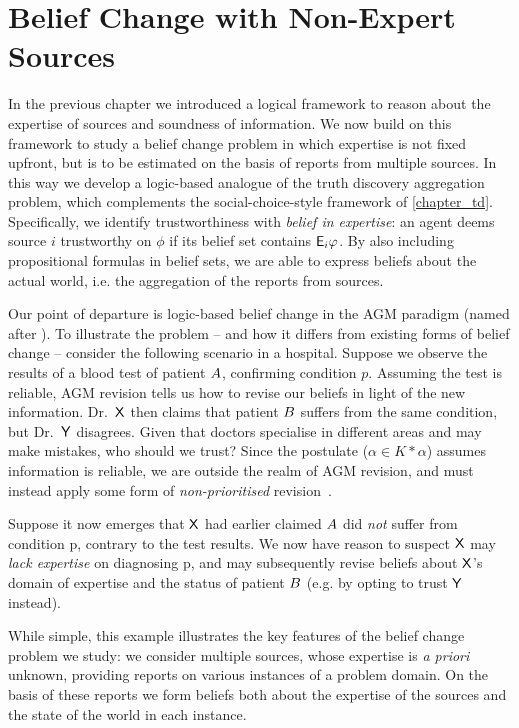 \chapter{Belief Change with Non-Expert Sources}
\label{chapter_belief_change}

In the previous chapter we introduced a logical framework to reason about the
expertise of sources and soundness of information. We now build on this
framework to study a belief change problem in which expertise is not fixed
upfront, but is to be estimated on the basis of reports from multiple sources.
In this way we develop a logic-based analogue of the truth discovery
aggregation problem, which complements the social-choice-style framework of
\cref{chapter_td}. Specifically, we identify trustworthiness with \emph{belief
in expertise}: an agent deems source $i$ trustworthy on $\phi$ if its belief
set contains $\mathsf{E}_i\varphi$. By also including
propositional formulas in belief sets, we are able to express beliefs about the
actual world, i.e. the aggregation of the reports from sources.

Our point of departure is logic-based belief change in the AGM
paradigm (named after \textcite{alchourron1985logic}).
%
%
To illustrate the problem -- and how it
differs from existing forms of belief change -- consider the following scenario
in a hospital. Suppose we observe the results of a blood test of patient $A$,
confirming condition $p$. Assuming the test is reliable, AGM revision tells us
how to revise our beliefs in light of the new information. Dr.\ $\mathsf{X}$ then claims
that patient $B$ suffers from the same condition, but Dr.\ $\mathsf{Y}$ disagrees. Given
that doctors specialise in different areas and may make mistakes, who should we
trust?
%
Since the  postulate ($\alpha \in K \ast \alpha$) assumes
information is reliable, we are outside the realm of AGM revision, and must
instead apply some form of \emph{non-prioritised}
revision~\cite{hansson1999survey}.

Suppose it now emerges that $\mathsf{X}$ had earlier claimed $A$ did \emph{not}
suffer from condition p, contrary to the test results. We now have reason to
suspect $\mathsf{X}$ may \emph{lack expertise} on diagnosing p, and may subsequently
revise beliefs about $\mathsf{X}$'s domain of expertise and the status of patient
$B$ (e.g. by opting to trust $\mathsf{Y}$ instead).

While simple, this example illustrates the key features of the belief change
problem we study: we consider multiple sources, whose expertise is \emph{a
priori} unknown, providing reports on various instances of a problem domain. On
the basis of these reports we form beliefs both about the expertise of the
sources and the state of the world in each instance.

